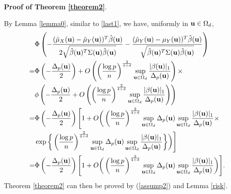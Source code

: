 \documentclass[11pt]{article}
\theoremstyle{definition}
\begin{document}
 
 \noindent
 {\bf Proof of Theorem \ref{theorem2}}.
 
 By Lemma \ref{lemma0}, similar to \eqref{last1},  we have, uniformly in ${\bf u}\in \Omega_d$,
 \begin{align}
 	&\Phi\left(-\frac{(\hat{\mu}_X({\bf u})-\hat{\mu}_Y({\bf u}))^T\hat{\beta}({\bf u})}{2\sqrt{\hat{\beta}({\bf u})^T\Sigma({\bf u})\hat{\beta}({\bf u})}}-\frac{(\hat{\mu}_Y({\bf u})-\mu_Y({\bf u}))^T\hat{\beta}({\bf u})}{\sqrt{\hat{\beta}({\bf u})^T\Sigma({\bf u})\hat{\beta}({\bf u})}}\right) \\
 	=&\Phi\left(-\frac{\Delta_p({\bf u})}{2}\right)+
 	O\left(\left(\frac{\log p}{n}\right)^{\frac{2}{4+d}}\sup_{{\bf u}\in \Omega_d} \frac{|\beta({\bf u})|_1}{\Delta_p({\bf u})}\right) \times \nonumber\\
 	&\phi\left(-\frac{\Delta_p({\bf u})}{2}+O\left(\left(\frac{\log p}{n}\right)^{\frac{2}{4+d}}\sup_{{\bf u}\in \Omega_d}\frac{|\beta({\bf u})|_1}{\Delta_p({\bf u})}\right) \right) \nonumber\\
 	=& \Phi\left(-\frac{\Delta_p({\bf u})}{2}\right)\Bigg[1+O\bigg( \left(\frac{\log p}{n}\right)^{\frac{2}{4+d}}\sup_{{\bf u}\in \Omega_d}\Delta_p({\bf u})\sup_{{\bf u}\in \Omega_d} \frac{|\beta({\bf u})|_1}{\Delta_p({\bf u})}\times  \nonumber \\
 	& \exp\bigg\{\left(\frac{\log p}{n}\right)^{\frac{2}{4+d}}\sup_{{\bf u}\in \Omega_d}\Delta_p({\bf u}) \sup_{{\bf u}\in \Omega_d}\frac{|\beta({\bf u})|_1}{\Delta_p({\bf u})}%
 	\bigg\}\bigg) \Bigg] \nonumber \\
 	=& \Phi\left(-\frac{\Delta_p({\bf u})}{2}\right)\Bigg[1+O\bigg(\left(\frac{\log p}{n}\right)^{\frac{2}{4+d}}\sup_{{\bf u}\in \Omega_d}\Delta_p({\bf u})\sup_{{\bf u}\in \Omega_d}  \frac{|\beta({\bf u})|_1}{\Delta_p({\bf u})}\bigg)\Bigg]. \nonumber
 \end{align}
 Theorem \ref{theorem2} can then be proved by (\ref{assump2}) and Lemma \ref{risk}.
 
\end{document}
